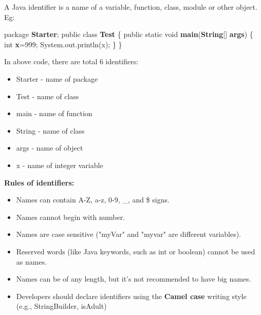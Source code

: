 
\begin{flushleft}
	
	A Java identifier is a name of a variable, function, class, module or other object.
	\newline
	Eg:
	\begin{tcolorbox}[breakable,notitle,boxrule=-0pt,colback=code,colframe=code]
		\color{black}
		\font=8pt
		package \textbf{Starter}; \newline
		\newline
		public class \textbf{Test} \{ \newline
		\hphantom{} \hphantom{}	public static void \textbf{main}(\textbf{String}[] \textbf{args}) \{ \newline
		\hphantom{} \hphantom{} \hphantom{} \hphantom{}	int \textbf{x}=999; \newline
		\hphantom{} \hphantom{} \hphantom{} \hphantom{}	System.out.println(x); \newline
		\hphantom{} \hphantom{}	\} \newline
		\}
		\font=4pt
	\end{tcolorbox}
	
	\newpage
	In above code, there are total 6 identifiers:
	\begin{itemize}
		\item Starter - name of package
		\item Test - name of class
		\item main - name of function
		\item String - name of class 
		\item args - name of object
		\item x - name of integer variable
	\end{itemize}
	
	\textbf{Rules of identifiers:}
	\begin{itemize}
		\item Names can contain A-Z, a-z, 0-9, \_, and \$ signs.
		\item Names cannot begin with number.
		\item Names are case sensitive ("myVar" and "myvar" are different variables).
		\item Reserved words (like Java keywords, such as int or boolean) cannot be used as names.
		\item Names can be of any length, but it's not recommended to have big names.
		\item Developers should declare identifiers using the \textbf{Camel case} writing style (e.g., StringBuilder, isAdult)
	\end{itemize}
	

\end{flushleft}
